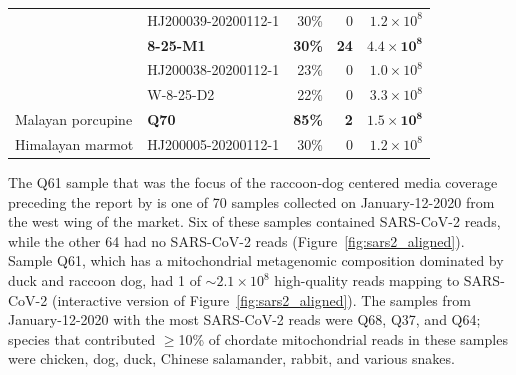 \documentclass[9pt,twocolumn,twoside]{gsajnl_modified}
\begin{document}
\begin{table}
{\begin{tabular}{llrrr}
                 & HJ200039-20200112-1 &                                30\% &                        0 &                   $1.2 \times 10^8$ \\
                 & {\bf 8-25-M1} &                                {\bf 30\%} &                      {\bf 24} &                   $\mathbf{4.4 \times 10^8}$ \\
                 & HJ200038-20200112-1 &                                23\% &                        0 &                     $1.0 \times 10^8$ \\
                 & W-8-25-D2 &                                22\% &                        0 &                   $3.3 \times 10^8$ \\
\cline{1-5}
Malayan porcupine & {\bf Q70} &                                {\bf 85\%} &                        {\bf 2} &                   $\mathbf{1.5 \times 10^8}$ \\
\cline{1-5}
Himalayan marmot & HJ200005-20200112-1 &                                30\% &                        0 &                   $1.2 \times 10^8$ \\
\bottomrule
\end{tabular}
}
\end{table}

The Q61 sample that was the focus of the raccoon-dog centered media coverage~\citep{wu2023atlantic,mueller2023nytimes} preceding the report by \citet{crits2023genetic} is one of 70 samples collected on January-12-2020 from the west wing of the market.
Six of these samples contained SARS-CoV-2 reads, while the other 64 had no SARS-CoV-2 reads (Figure~\ref{fig:sars2_aligned}).
Sample Q61, which has a mitochondrial metagenomic composition dominated by duck and raccoon dog, had 1 of $\sim2.1 \times 10^8$ high-quality reads mapping to SARS-CoV-2 (interactive version of Figure~\ref{fig:sars2_aligned}).
The samples from January-12-2020 with the most SARS-CoV-2 reads were Q68, Q37, and Q64; species that contributed $\ge$10\% of chordate mitochondrial reads in these samples were chicken, dog, duck, Chinese salamander, rabbit, and various snakes.
\end{document}
